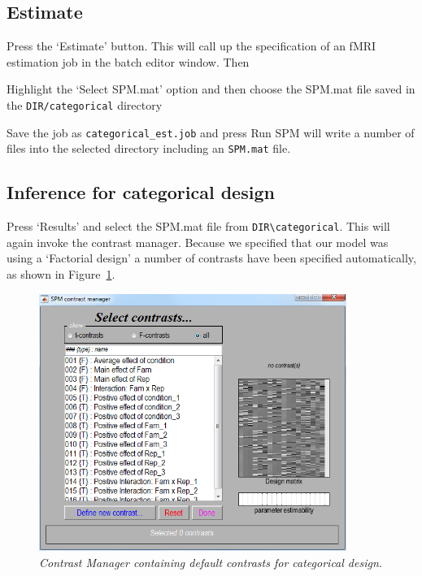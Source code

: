 \subsection{Estimate}

Press the `Estimate' button. This will call up the specification of an fMRI estimation job in the batch editor window. Then
\bi
\item{Highlight the `Select SPM.mat' option and then choose the SPM.mat
file saved in the \verb!DIR/categorical! directory}
\item{Save the job as \verb!categorical_est.job! and press Run}
\ei
SPM will write a number of files into the selected directory including 
an \verb!SPM.mat! file.

\subsection{Inference for categorical design}

Press `Results' and select the SPM.mat file from 
\verb!DIR\categorical!. This will again invoke the contrast manager. Because we specified that 
our model was using a `Factorial design' a number of 
contrasts have been specified automatically, as shown 
in Figure~\ref{cat_contrasts}.
\begin{figure}
\begin{center}
\includegraphics[width=100mm]{faces/cat_contrasts}
\caption{\em Contrast Manager containing default contrasts for categorical design. \label{cat_contrasts}}
\end{center}
\end{figure}

